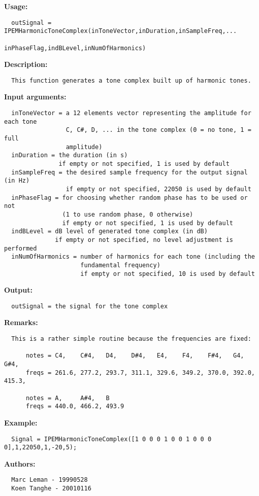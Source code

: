 \textbf{Usage:}
\begin{verbatim}  outSignal = IPEMHarmonicToneComplex(inToneVector,inDuration,inSampleFreq,...
                                      inPhaseFlag,indBLevel,inNumOfHarmonics)

\end{verbatim}
\textbf{Description:}
\begin{verbatim}  This function generates a tone complex built up of harmonic tones.

\end{verbatim}
\textbf{Input arguments:}
\begin{verbatim}  inToneVector = a 12 elements vector representing the amplitude for each tone
                 C, C#, D, ... in the tone complex (0 = no tone, 1 = full
                 amplitude)
  inDuration = the duration (in s)
               if empty or not specified, 1 is used by default
  inSampleFreq = the desired sample frequency for the output signal (in Hz)
                 if empty or not specified, 22050 is used by default
  inPhaseFlag = for choosing whether random phase has to be used or not
                (1 to use random phase, 0 otherwise)
                if empty or not specified, 1 is used by default
  indBLevel = dB level of generated tone complex (in dB)
              if empty or not specified, no level adjustment is performed
  inNumOfHarmonics = number of harmonics for each tone (including the
                     fundamental frequency)
                     if empty or not specified, 10 is used by default

\end{verbatim}
\textbf{Output:}
\begin{verbatim}  outSignal = the signal for the tone complex

\end{verbatim}
\textbf{Remarks:}
\begin{verbatim}  This is a rather simple routine because the frequencies are fixed:

      notes = C4,    C#4,   D4,    D#4,   E4,    F4,    F#4,   G4,    G#4,
      freqs = 261.6, 277.2, 293.7, 311.1, 329.6, 349.2, 370.0, 392.0, 415.3,

      notes = A,     A#4,   B
      freqs = 440.0, 466.2, 493.9

\end{verbatim}
\textbf{Example:}
\begin{verbatim}  Signal = IPEMHarmonicToneComplex([1 0 0 0 1 0 0 1 0 0 0 0],1,22050,1,-20,5);

\end{verbatim}
\textbf{Authors:}
\begin{verbatim}  Marc Leman - 19990528
  Koen Tanghe - 20010116
\end{verbatim}



